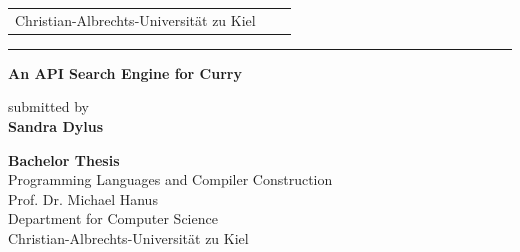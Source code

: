 \documentclass[%
	latex,%
	a4paper,%
	oneside,%
	chapterprefix,%
	headsepline,%
	12pt%
]{scrbook}
\begin{document}


\newcommand{\trtitle}{An API Search Engine for Curry}
\newcommand{\trtype}{Bachelor Thesis}
\newcommand{\trauthor}{Sandra Dylus}
\newcommand{\trbetreuer}{M.o.Sc. Bj\"orn Peem\"oller}
\newcommand{\trprof}{Prof. Dr. Michael Hanus}
\newcommand{\trfachgebiet}{Programming Languages and Compiler Construction}
\newcommand{\trinstitut}{Computer Science}
\newcommand{\trfakultaet}{Technische Fakult\"at}
\newcommand{\truni}{Christian-Albrechts-Universit\"at zu Kiel}
\newcommand{\trdate}{\today}

\thispagestyle{empty}

\begin{tabular}{lcr}
\truni 
  \\
\end{tabular}

\rule{\textwidth}{0.4pt}

\vspace{2.5cm}
\begin{center}
  \textbf{\LARGE \trtitle}
\end{center}

\begin{center}
  submitted by \\
  \textbf{\trauthor}
\end{center}
\vspace{2cm}

\begin{center}
  \textbf{\trtype} \\
  \trfachgebiet \\
  \trprof \\
  Department for \trinstitut \\
  \truni \\[0.5cm]
\end{center}
\end{document}
